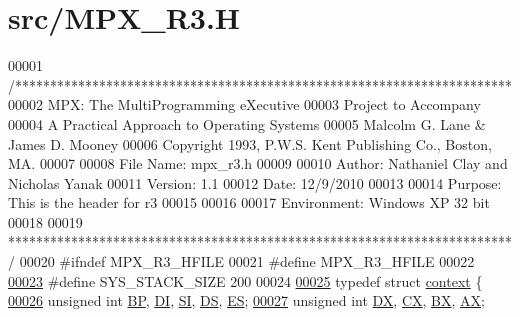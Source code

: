 \hypertarget{_m_p_x___r3_8_h_source}{
\section{src/MPX\_\-R3.H}
}

\begin{DoxyCode}
00001 \textcolor{comment}{/***********************************************************************}
00002 \textcolor{comment}{        MPX: The MultiProgramming eXecutive}
00003 \textcolor{comment}{        Project to Accompany}
00004 \textcolor{comment}{        A Practical Approach to Operating Systems}
00005 \textcolor{comment}{        Malcolm G. Lane & James D. Mooney}
00006 \textcolor{comment}{        Copyright 1993, P.W.S. Kent Publishing Co., Boston, MA.}
00007 \textcolor{comment}{}
00008 \textcolor{comment}{        File Name:      mpx\_r3.h}
00009 \textcolor{comment}{}
00010 \textcolor{comment}{        Author: Nathaniel Clay and Nicholas Yanak}
00011 \textcolor{comment}{        Version: 1.1}
00012 \textcolor{comment}{        Date:  12/9/2010}
00013 \textcolor{comment}{}
00014 \textcolor{comment}{        Purpose: This is the header for r3}
00015 \textcolor{comment}{}
00016 \textcolor{comment}{                }
00017 \textcolor{comment}{        Environment: Windows XP 32 bit}
00018 \textcolor{comment}{}
00019 \textcolor{comment}{************************************************************************/}
00020 \textcolor{preprocessor}{#ifndef MPX\_R3\_HFILE}
00021 \textcolor{preprocessor}{}\textcolor{preprocessor}{#define MPX\_R3\_HFILE}
00022 \textcolor{preprocessor}{}
\hypertarget{_m_p_x___r3_8_h_source_l00023}{}\hyperlink{_m_p_x___r3_8_h_aca4404f2715f3a392a0d6bc0d73c0da0}{00023} \textcolor{preprocessor}{#define SYS\_STACK\_SIZE 200}
00024 \textcolor{preprocessor}{} 
\hypertarget{_m_p_x___r3_8_h_source_l00025}{}\hyperlink{structcontext}{00025} \textcolor{keyword}{typedef} \textcolor{keyword}{struct }\hyperlink{structcontext}{context} \{
\hypertarget{_m_p_x___r3_8_h_source_l00026}{}\hyperlink{structcontext_a6b7fc81c19dfbd3a1438eb7738a712d8}{00026}         \textcolor{keywordtype}{unsigned} \textcolor{keywordtype}{int} \hyperlink{structcontext_a036a2e025f269d00b084e69796f45680}{BP}, \hyperlink{structcontext_a71fd72ac821b4c932ad6f5befd4a5ea4}{DI}, \hyperlink{structcontext_a6b7fc81c19dfbd3a1438eb7738a712d8}{SI}, \hyperlink{structcontext_a657e73663a4443be61a078d31c28ee3e}{DS}, \hyperlink{structcontext_a81a78fef7bda3a5dd852b28a905890ab}{ES};
\hypertarget{_m_p_x___r3_8_h_source_l00027}{}\hyperlink{structcontext_a520e6d1f4fcf543e914e536248da306e}{00027}         \textcolor{keywordtype}{unsigned} \textcolor{keywordtype}{int} \hyperlink{structcontext_a520e6d1f4fcf543e914e536248da306e}{DX}, \hyperlink{structcontext_a7f06dbf351fa2b704708aadf139eb1d4}{CX}, \hyperlink{structcontext_acd2a72acb8e494afd3c30c3614e567ee}{BX}, \hyperlink{structcontext_ac566b46485abbfc32ce69987dfbd0d1f}{AX};

\end{DoxyCode}

